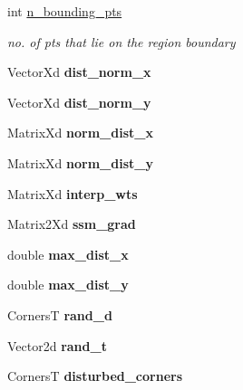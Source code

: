 \begin{DoxyCompactItemize}
\item 
\hypertarget{classSpline_a0b91fab8f2dae929fc3667ef72e5a34f}{int \hyperlink{classSpline_a0b91fab8f2dae929fc3667ef72e5a34f}{n\-\_\-bounding\-\_\-pts}}\label{classSpline_a0b91fab8f2dae929fc3667ef72e5a34f}

\begin{DoxyCompactList}\small\item\em no. of pts that lie on the region boundary \end{DoxyCompactList}\item 
\hypertarget{classSpline_abeffac509f6c4054516bb2ab55b35ff3}{Vector\-Xd {\bfseries dist\-\_\-norm\-\_\-x}}\label{classSpline_abeffac509f6c4054516bb2ab55b35ff3}

\item 
\hypertarget{classSpline_a073558ed64129750a3113b10074ad030}{Vector\-Xd {\bfseries dist\-\_\-norm\-\_\-y}}\label{classSpline_a073558ed64129750a3113b10074ad030}

\item 
\hypertarget{classSpline_ac3bfb810b618e00caceed62a945b5043}{Matrix\-Xd {\bfseries norm\-\_\-dist\-\_\-x}}\label{classSpline_ac3bfb810b618e00caceed62a945b5043}

\item 
\hypertarget{classSpline_a03a9c16ae4773e778fc16da29b364823}{Matrix\-Xd {\bfseries norm\-\_\-dist\-\_\-y}}\label{classSpline_a03a9c16ae4773e778fc16da29b364823}

\item 
\hypertarget{classSpline_a21585abde3cb02d6992974b5e5611cff}{Matrix\-Xd {\bfseries interp\-\_\-wts}}\label{classSpline_a21585abde3cb02d6992974b5e5611cff}

\item 
\hypertarget{classSpline_a24526fc85034452f1d25807a614f6915}{Matrix2\-Xd {\bfseries ssm\-\_\-grad}}\label{classSpline_a24526fc85034452f1d25807a614f6915}

\item 
\hypertarget{classSpline_a225d3b08d138a1c4f4caf00ccbcc5945}{double {\bfseries max\-\_\-dist\-\_\-x}}\label{classSpline_a225d3b08d138a1c4f4caf00ccbcc5945}

\item 
\hypertarget{classSpline_a48fd6f84b07f76e667eaea8587a52c49}{double {\bfseries max\-\_\-dist\-\_\-y}}\label{classSpline_a48fd6f84b07f76e667eaea8587a52c49}

\item 
\hypertarget{classSpline_a2abf81082e59871dfa9f02b3aba5c44f}{Corners\-T {\bfseries rand\-\_\-d}}\label{classSpline_a2abf81082e59871dfa9f02b3aba5c44f}

\item 
\hypertarget{classSpline_adb9cd67d23f4f1b75a718f373472bc2d}{Vector2d {\bfseries rand\-\_\-t}}\label{classSpline_adb9cd67d23f4f1b75a718f373472bc2d}

\item 
\hypertarget{classSpline_a27863a66e8d5396b2bedb493d4d327ba}{Corners\-T {\bfseries disturbed\-\_\-corners}}\label{classSpline_a27863a66e8d5396b2bedb493d4d327ba}

\end{DoxyCompactItemize}
